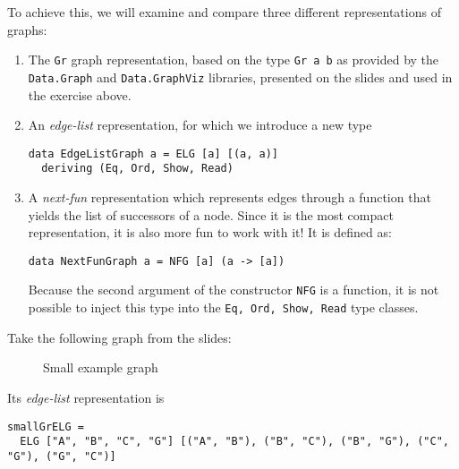 \documentclass[english]{article}
\begin{document}
To achieve this, we will examine and compare three different representations of graphs:
\begin{enumerate}
\item The \texttt{Gr} graph representation, based on the type \texttt{Gr a b}
  as provided by the \texttt{Data.Graph} and \texttt{Data.GraphViz} libraries,
  presented on the slides and used in the exercise above.
\item An \emph{edge-list} representation, for which we introduce a new type
\begin{lstlisting}
data EdgeListGraph a = ELG [a] [(a, a)]
  deriving (Eq, Ord, Show, Read)
\end{lstlisting}
  
\item A \emph{next-fun} representation which represents edges through a function that
  yields the list of successors of a node. Since it is the most compact
  representation, it is also more fun to work with it! It is defined as:
\begin{lstlisting}
data NextFunGraph a = NFG [a] (a -> [a])
\end{lstlisting}
Because the second argument of the constructor \texttt{NFG} is a function, it
is not possible to inject this type into the \texttt{Eq, Ord, Show, Read} type classes.
\end{enumerate}

Take the following graph from the slides:

\begin{figure}[h]
\begin{center}
\end{center}
\caption{Small example graph}\label{fig:small_example_graph}
\end{figure}

Its \emph{edge-list} representation is 
\begin{lstlisting}
smallGrELG =
  ELG ["A", "B", "C", "G"] [("A", "B"), ("B", "C"), ("B", "G"), ("C", "G"), ("G", "C")]
\end{lstlisting}
\end{document}
